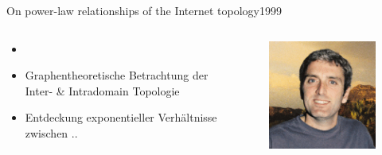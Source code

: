 \documentclass[ngerman,compress,hyperref={bookmarks}]{beamer}
\begin{document}
\begin{frame}{On power-law relationships of the Internet topology}{1999}
  \begin{columns}[c]
    \begin{column}{0.5\textwidth}
      \begin{itemize}
        \item \cite{Faloutsos:1999:PRI:316194.316229}
        \item Graphentheoretische Betrachtung der Inter- \& Intradomain Topologie
        \item Entdeckung exponentieller Verhältnisse zwischen ..
      \end{itemize}
    \end{column}
    \begin{column}{0.1\textwidth}
      \begin{figure}
        \includegraphics[width=1\textwidth]{images/faloutsos_m}\\

\end{figure}
\end{column}
\end{columns}
\end{frame}
\end{document}
